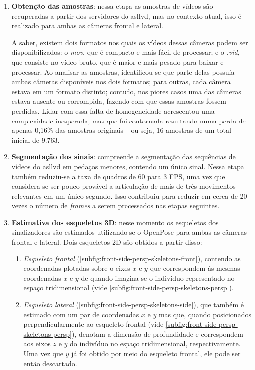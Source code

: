 \begin{enumerate}
    \item \textbf{Obtenção das amostras}: nessa etapa as amostras de vídeos são recuperadas a partir dos servidores do \acrshort{asllvd}, mas no contexto atual, isso é realizado para ambas as câmeras frontal e lateral.

          A saber, existem dois formatos nos quais os vídeos dessas câmeras podem ser disponibilizados: o \textit{mov}, que é compacto e mais fácil de processar; e o \textit{.vid}, que consiste no vídeo bruto, que é maior e mais pesado para baixar e processar.
          Ao analisar as amostras, identificou-se que parte delas possuía ambas câmeras disponíveis nos dois formatos; para outras, cada câmera estava em um formato distinto; contudo, nos piores casos uma das câmeras estava ausente ou corrompida, fazendo com que essas amostras fossem perdidas. Lidar com essa falta de homogeneidade acrescentou uma complexidade inesperada, mas que foi contornada resultando numa perda de apenas 0,16\% das amostras originais -- ou seja, 16 amostras de um total inicial de 9.763.


    \item \textbf{Segmentação dos sinais}: compreende a segmentação das sequências de vídeos do \acrshort{asllvd} em pedaços menores, contendo um único sinal.
          Nessa etapa também reduziu-se a taxa de quadros de 60 para 3 FPS, uma vez que considera-se ser pouco provável a articulação de mais de três movimentos relevantes em um único segundo.
          Isso contribuiu para reduzir em cerca de 20 vezes o número de \textit{frames} a serem processados nas etapas seguintes.


    \item \textbf{Estimativa dos esqueletos 3D}: nesse momento os esqueletos dos sinalizadores são estimados utilizando-se o OpenPose para ambas as câmeras frontal e lateral. Dois esqueletos 2D são obtidos a partir disso:

          \begin{enumerate}
              \item \textit{Esqueleto frontal} (\autoref{subfig:front-side-persp-skeletons-front}), contendo as coordenadas plotadas sobre o eixos \(x\) e \(y\) que correspondem às mesmas coordenadas \(x\) e \(y\) de quando imagina-se o indivíduo representado no espaço tridimensional (vide \autoref{subfig:front-side-persp-skeletons-persp}).

              \item \textit{Esqueleto lateral} (\autoref{subfig:front-side-persp-skeletons-side}), que também é estimado com um par de coordenadas \(x\) e \(y\) mas que, quando posicionados perpendicularmente ao esqueleto frontal (vide \autoref{subfig:front-side-persp-skeletons-persp}), denotam a dimensão de profundidade e correspondem aos eixos \(z\) e \(y\) do indivíduo no espaço tridimensional, respectivamente. Uma vez que \(y\) já foi obtido por meio do esqueleto frontal, ele pode ser então descartado.


\end{enumerate}
\end{enumerate}
